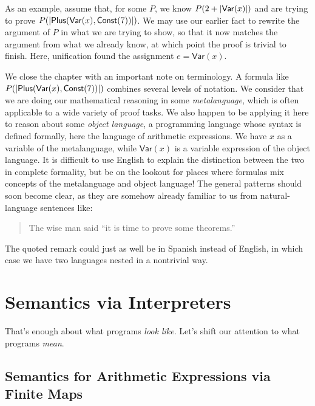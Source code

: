 \documentclass{amsbook}
\theoremstyle{definition}
\theoremstyle{remark}
\numberwithin{section}{chapter}
\numberwithin{equation}{chapter}
\begin{document}
As an example, assume that, for some $P$, we know $P(2 + {\left \lvert \mathsf{Var}(x) \right \rvert})$ and are trying to prove $P({\left \lvert \mathsf{Plus}(\mathsf{Var}(x), \mathsf{Const}(7)) \right \rvert})$.
We may use our earlier fact to rewrite the argument of $P$ in what we are trying to show, so that it now matches the argument from what we already know, at which point the proof is trivial to finish.
Here, unification found the assignment $e = \mathsf{Var}(x)$.

\medskip

\encoding
We close the chapter with an important note on terminology.
A formula like $P({\left \lvert \mathsf{Plus}(\mathsf{Var}(x), \mathsf{Const}(7)) \right \rvert})$ combines several levels of notation.
We consider that we are doing our mathematical reasoning in some \emph{metalanguage}, which is often applicable to a wide variety of proof tasks.
We also happen to be applying it here to reason about some \emph{object language}, a programming language whose syntax is defined formally, here the language of arithmetic expressions.
We have $x$ as a variable of the metalanguage, while $\mathsf{Var}(x)$ is a variable expression of the object language.
It is difficult to use English to explain the distinction between the two in complete formality, but be on the lookout for places where formulas mix concepts of the metalanguage and object language!
The general patterns should soon become clear, as they are somehow already familiar to us from natural-language sentences like:
\begin{quote}
  The wise man said ``it is time to prove some theorems.''
\end{quote}
The quoted remark could just as well be in Spanish instead of English, in which case we have two languages nested in a nontrivial way.


\chapter{Semantics via Interpreters}

That's enough about what programs \emph{look like}.
Let's shift our attention to what programs \emph{mean}.

\section{Semantics for Arithmetic Expressions via Finite Maps}
\end{document}
